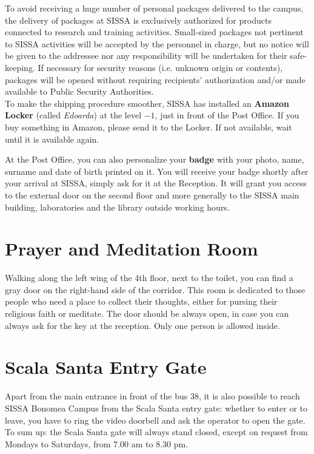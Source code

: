 \documentclass{sissavademecum}
\begin{document}
To avoid receiving a huge number of personal packages delivered to the campus, the delivery of packages at SISSA is exclusively authorized for products connected to research and training activities. Small-sized packages not pertinent to SISSA activities will be accepted by the personnel in charge, but no notice will be given to the addressee nor any responsibility will be undertaken for their safe-keeping. If necessary for security reasons (i.e. unknown origin or contents), packages will be opened without requiring recipients' authorization and/or made available to Public Security Authorities.\\
To make the shipping procedure smoother, SISSA has installed an \textbf{Amazon Locker} (called \emph{Edoarda}) at the level $-1$, just in front of the Post Office. If you buy something in Amazon, please send it to the Locker. If not available, wait until it is available again. 


At the Post Office, you can also personalize your \hypertarget{Badge}{}\textbf{badge} with your photo, name, surname and date of birth printed on it. You will receive your badge shortly after your arrival at SISSA, simply ask for it at the Reception. It will grant you access to the external door on the second floor and more generally to the SISSA main building, laboratories and the library outside working hours.


\section{Prayer and Meditation Room}

Walking along the left wing of the 4th floor, next to the toilet, you can find a gray door on the right-hand side of the corridor. This room is dedicated to those people who need a place to collect their thoughts, either for pursing their religious faith or meditate. The door should be always open, in case you can always ask for the key at the reception. Only one person is allowed inside.


\section{Scala Santa Entry Gate}

Apart from the main entrance in front of the bus 38, it is also possible to reach SISSA Bonomea Campus from the Scala Santa entry gate: whether to enter or to leave, you have to ring the video doorbell and ask the operator to open the gate. To sum up: the Scala Santa gate will always stand closed, except on request from Mondays to Saturdays, from 7.00 am to 8.30 pm.
\end{document}
